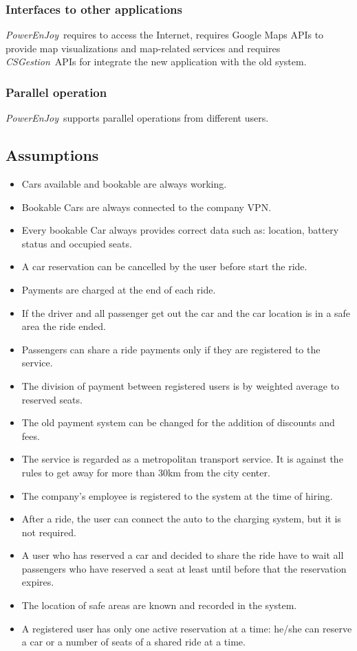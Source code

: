 \documentclass{article}
\newcommand{\pej}{\mbox{\normalfont\itshape PowerEnJoy }}
\newcommand{\csg}{\mbox{\normalfont\itshape CSGestion }}
\begin{document}
		\subsubsection{Interfaces to other applications}
		\pej requires to access the Internet, requires Google Maps APIs to provide map visualizations
		and map-related services and requires \csg APIs for integrate the new application with the old system.
		\subsubsection{Parallel operation}
		\pej supports parallel operations from different users.
		\subsection{Assumptions}
		\begin{itemize}
			\item Cars available and bookable are always working.
			\item Bookable Cars are always connected to the company VPN.
			\item Every bookable Car always provides correct data such as: location, battery status and occupied seats.
			\item A car reservation can be cancelled by the user before start the ride.
			\item Payments are charged at the end of each ride.
			\item If the driver and all passenger get out the car and the car location is in a safe area the ride ended.
			\item Passengers can share a ride payments only if they are registered to the service.
			\item The division of payment between registered users is by weighted average to reserved seats.
			\item The old payment system can be changed for the addition of discounts and fees.
			\item The service is regarded as a metropolitan transport service. It is against the rules to get away for more than 30km from the city center.
			\item The company's employee is registered to the system at the time of hiring.
			\item After a ride, the user can connect the auto to the charging system, but it is not required.
			\item A user who has reserved a car and decided to share the ride have to wait all passengers who have reserved a seat at least until before that the reservation expires.
			\item The location of safe areas are known and recorded in the system.
			\item A registered user has only one active reservation at a time: he/she can reserve a car or a number of seats of a shared ride at a time.
		\end{itemize}
\end{document}
